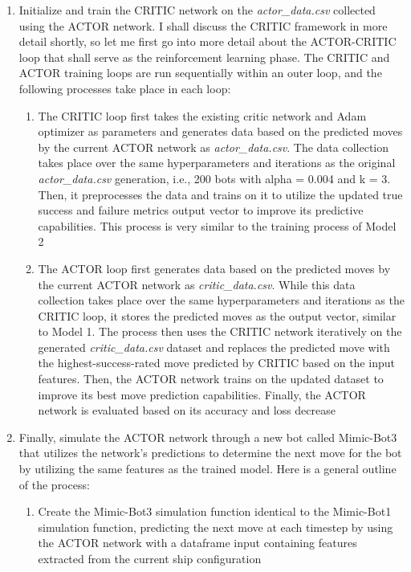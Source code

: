 \documentclass[11pt]{article}
\begin{document}
\begin{enumerate}
    \item Initialize and train the CRITIC network on the \emph{actor\_data.csv} collected using the ACTOR network. I shall discuss the CRITIC framework in more detail shortly, so let me first go into more detail about the ACTOR-CRITIC loop that shall serve as the reinforcement learning phase. The CRITIC and ACTOR training loops are run sequentially within an outer loop, and the following processes take place in each loop:
    \begin{enumerate}
        \item The CRITIC loop first takes the existing critic network and Adam optimizer as parameters and generates data based on the predicted moves by the current ACTOR network as \emph{actor\_data.csv}. The data collection takes place over the same hyperparameters and iterations as the original \emph{actor\_data.csv} generation, i.e., 200 bots with alpha = 0.004 and k = 3. Then, it preprocesses the data and trains on it to utilize the updated true success and failure metrics output vector to improve its predictive capabilities. This process is very similar to the training process of Model 2
        \item The ACTOR loop first generates data based on the predicted moves by the current ACTOR network as \emph{critic\_data.csv}. While this data collection takes place over the same hyperparameters and iterations as the CRITIC loop, it stores the predicted moves as the output vector, similar to Model 1. The process then uses the CRITIC network iteratively on the generated \emph{critic\_data.csv} dataset and replaces the predicted move with the highest-success-rated move predicted by CRITIC based on the input features. Then, the ACTOR network trains on the updated dataset to improve its best move prediction capabilities. Finally, the ACTOR network is evaluated based on its accuracy and loss decrease
    \end{enumerate}
    \item Finally, simulate the ACTOR network through a new bot called Mimic-Bot3 that utilizes the network's predictions to determine the next move for the bot by utilizing the same features as the trained model. Here is a general outline of the process:
    \begin{enumerate}
        \item Create the Mimic-Bot3 simulation function identical to the Mimic-Bot1 simulation function, predicting the next move at each timestep by using the ACTOR network with a dataframe input containing features extracted from the current ship configuration

\end{enumerate}
\end{enumerate}
\end{document}
